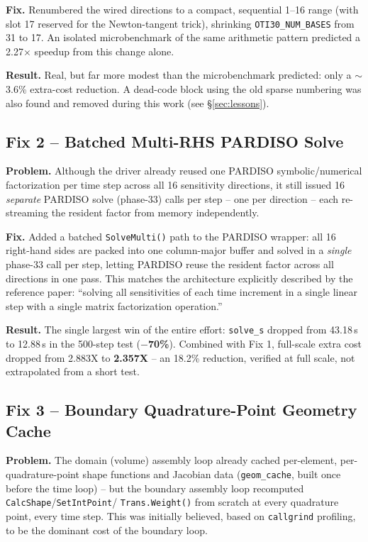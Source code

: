 \documentclass[11pt]{article}
\begin{document}
\textbf{Fix.} Renumbered the wired directions to a compact, sequential
1--16 range (with slot 17 reserved for the Newton-tangent trick),
shrinking \texttt{OTI30\_NUM\_BASES} from 31 to 17. An isolated
microbenchmark of the same arithmetic pattern predicted a 2.27$\times$
speedup from this change alone.

\textbf{Result.} Real, but far more modest than the microbenchmark
predicted: only a $\sim$3.6\% extra-cost reduction. A dead-code block
using the old sparse numbering was also found and removed during this
work (see \S\ref{sec:lessons}).

\subsection{Fix 2 -- Batched Multi-RHS PARDISO Solve}
\textbf{Problem.} Although the driver already reused one PARDISO
symbolic/numerical factorization per time step across all 16 sensitivity
directions, it still issued 16 \emph{separate} PARDISO solve (phase-33)
calls per step -- one per direction -- each re-streaming the resident
factor from memory independently.

\textbf{Fix.} Added a batched \texttt{SolveMulti()} path to the PARDISO
wrapper: all 16 right-hand sides are packed into one column-major buffer
and solved in a \emph{single} phase-33 call per step, letting PARDISO
reuse the resident factor across all directions in one pass. This matches
the architecture explicitly described by the reference paper: ``solving
all sensitivities of each time increment in a single linear step with a
single matrix factorization operation.''

\textbf{Result.} The single largest win of the entire effort:
\texttt{solve\_s} dropped from 43.18\,s to 12.88\,s in the 500-step test
(\textbf{$-$70\%}). Combined with Fix 1, full-scale extra cost dropped
from 2.883X to \textbf{2.357X} -- an 18.2\% reduction, verified at full
scale, not extrapolated from a short test.

\subsection{Fix 3 -- Boundary Quadrature-Point Geometry Cache}
\textbf{Problem.} The domain (volume) assembly loop already cached
per-element, per-quadrature-point shape functions and Jacobian data
(\texttt{geom\_cache}, built once before the time loop) -- but the
boundary assembly loop recomputed \texttt{CalcShape}/\texttt{SetIntPoint}/
\texttt{Trans.Weight()} from scratch at every quadrature point, every
time step. This was initially believed, based on \texttt{callgrind}
profiling, to be the dominant cost of the boundary loop.
\end{document}
